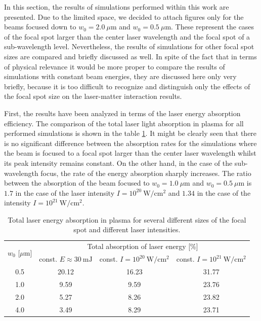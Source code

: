 In this section, the results of simulations performed within this work are presented. Due to the limited space, we decided to attach figures only for the beams focused down to $ w_0 = 2.0 \ \mu\mathrm{m} $ and $ w_0 = 0.5 \ \mu\mathrm{m} $. These represent the cases of the focal spot larger than the center laser wavelength and the focal spot of a sub-wavelength level. Nevertheless, the results of simulations for other focal spot sizes are compared and briefly discussed as well. In spite of the fact that in terms of physical relevance it would be more proper to compare the results of simulations with constant beam energies, they are discussed here only very briefly, because it is too difficult to recognize and distinguish only the effects of the focal spot size on the laser-matter interaction results.

First, the results have been analyzed in terms of the laser energy absorption efficiency. The comparison of the total laser light absorption in plasma for all performed simulations is shown in the table \ref{table:2}. It might be clearly seen that there is no significant difference between the absorption rates for the simulations where the beam is focused to a focal spot larger than the center laser wavelength whilst its peak intensity remains constant. On the other hand, in the case of the sub-wavelength focus, the rate of the energy absorption sharply increases. The ratio between the absorption of the beam focused to $ w_0 = 1.0 \ \mu\mathrm{m} $ and $ w_0 = 0.5 \ \mu\mathrm{m} $ is $ 1.7 $ in the case of the laser intensity $ I = 10^{20} \ \mathrm{W/cm^2} $ and $ 1.34 $ in the case of the intensity $ I = 10^{21} \ \mathrm{W/cm^2} $.

\begingroup
\renewcommand*{\arraystretch}{1.5}
\begin{table}[h!]
	\centering
	\begin{tabular}{c | c | c | c}
		\multirow{2}{*}{$ w_0 $ [$ \mu\mathrm{m} $]} & \multicolumn{3}{c}{Total absorption of laser energy [\%]} \\ \cline{2-4}
		& const. $ E \approx 30 \ \mathrm{mJ} $ & const. $ I = 10^{20} \ \mathrm{W/cm^2} $ & const. $ I = 10^{21} \ \mathrm{W/cm^2} $ \\ \hline \hline
		0.5 & 20.12 & 16.23 & 31.77 \\ \hline
		1.0 & 9.59 & 9.59 & 23.76 \\ \hline
		2.0 & 5.27 & 8.26 & 23.82 \\ \hline
		4.0 & 3.49 & 8.29 & 23.71 \\
	\end{tabular}
	\caption{Total laser energy absorption in plasma for several different sizes of the focal spot and different laser intensities.}
	\label{table:2}
\end{table}
\endgroup

